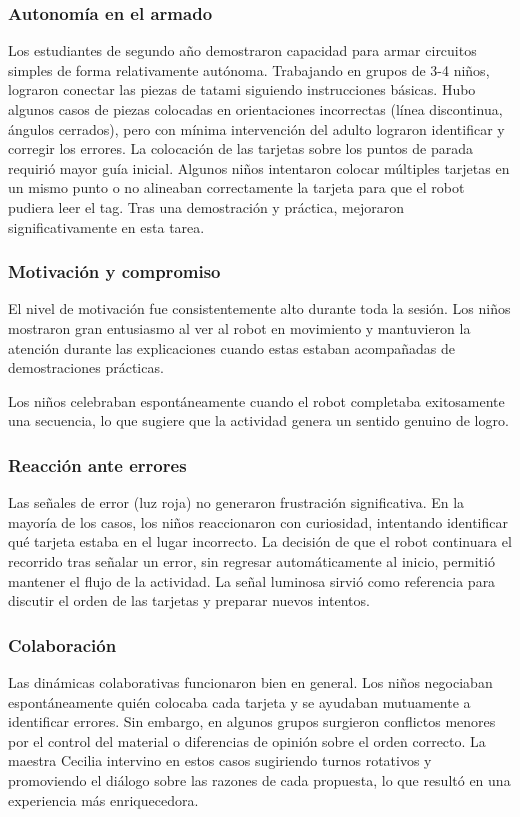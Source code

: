 \documentclass{prgrado}
\begin{document}
\subsubsection{Autonomía en el armado}
Los estudiantes de segundo año demostraron capacidad para armar circuitos simples de forma relativamente autónoma. Trabajando en grupos de 3-4 niños, lograron conectar las piezas de tatami siguiendo instrucciones básicas. Hubo algunos casos de piezas colocadas en orientaciones incorrectas (línea discontinua, ángulos cerrados), pero con mínima intervención del adulto lograron identificar y corregir los errores.
La colocación de las tarjetas sobre los puntos de parada requirió mayor guía inicial. Algunos niños intentaron colocar múltiples tarjetas en un mismo punto o no alineaban correctamente la tarjeta para que el robot pudiera leer el tag. Tras una demostración y práctica, mejoraron significativamente en esta tarea.
\subsubsection{Motivación y compromiso}
El nivel de motivación fue consistentemente alto durante toda la sesión. Los niños mostraron gran entusiasmo al ver al robot en movimiento y mantuvieron la atención durante las explicaciones cuando estas estaban acompañadas de demostraciones prácticas.

Los niños celebraban espontáneamente cuando el robot completaba exitosamente una secuencia, lo que sugiere que la actividad genera un sentido genuino de logro.
\subsubsection{Reacción ante errores}
Las señales de error (luz roja) no generaron frustración significativa. En la mayoría de los casos, los niños reaccionaron con curiosidad, intentando identificar qué tarjeta estaba en el lugar incorrecto. La decisión de que el robot continuara el recorrido tras señalar un error, sin regresar automáticamente al inicio, permitió mantener el flujo de la actividad. La señal luminosa sirvió como referencia para discutir el orden de las tarjetas y preparar nuevos intentos.
\subsubsection{Colaboración}
Las dinámicas colaborativas funcionaron bien en general. Los niños negociaban espontáneamente quién colocaba cada tarjeta y se ayudaban mutuamente a identificar errores. Sin embargo, en algunos grupos surgieron conflictos menores por el control del material o diferencias de opinión sobre el orden correcto.
La maestra Cecilia intervino en estos casos sugiriendo turnos rotativos y promoviendo el diálogo sobre las razones de cada propuesta, lo que resultó en una experiencia más enriquecedora.
\end{document}

